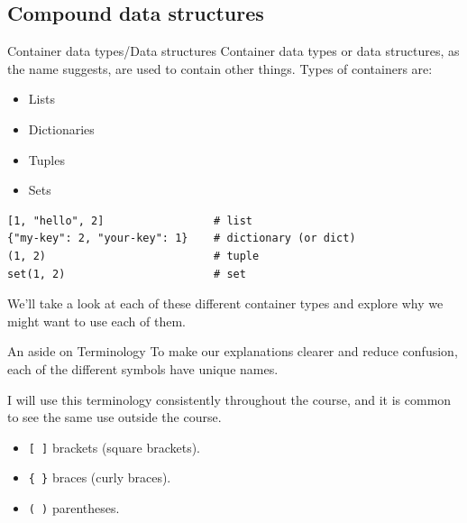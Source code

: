 \documentclass[10pt]{beamer}
\begin{document}
\subsection{Compound data structures}
\label{sec:org8cb7bb8}
\begin{frame}[label={sec:org018339b},fragile]{Container data types/Data structures}
 Container data types or data structures, as the name suggests, are used to contain
other things. Types of containers are:

\begin{itemize}
\item Lists
\item Dictionaries
\item Tuples
\item Sets
\end{itemize}

\begin{verbatim}
[1, "hello", 2]                 # list
{"my-key": 2, "your-key": 1}    # dictionary (or dict)
(1, 2)                          # tuple
set(1, 2)                       # set
\end{verbatim}

We'll take a look at each of these different container types and explore why we
might want to use each of them.
\end{frame}

\begin{frame}[label={sec:org4f0d4b9},fragile]{An aside on Terminology}
 To make our explanations clearer and reduce confusion, each of the different symbols
have unique names.

I will use this terminology consistently throughout the course, and it is common to
see the same use outside the course.

\begin{itemize}
\item \texttt{[ ]} brackets (square brackets).
\item \texttt{\{ \}} braces (curly braces).
\item \texttt{( )} parentheses.
\end{itemize}
\end{frame}
\end{document}
